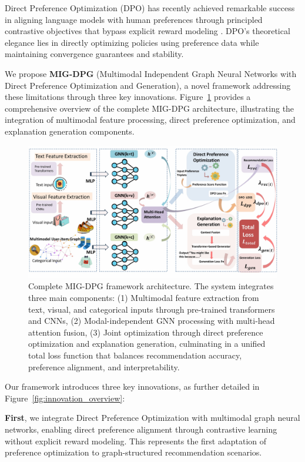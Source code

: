 \documentclass[pdflatex,sn-mathphys-num]{sn-jnl}%
\theoremstyle{thmstyleone}%
\theoremstyle{thmstyletwo}%
\theoremstyle{thmstylethree}%
\begin{document}
Direct Preference Optimization (DPO) has recently achieved remarkable success in aligning language models with human preferences through principled contrastive objectives that bypass explicit reward modeling \cite{rafailov2024direct}. DPO's theoretical elegance lies in directly optimizing policies using preference data while maintaining convergence guarantees and stability.

We propose \textbf{MIG-DPG} (Multimodal Independent Graph Neural Networks with Direct Preference Optimization and Generation), a novel framework addressing these limitations through three key innovations. Figure~\ref{fig:totalstructure} provides a comprehensive overview of the complete MIG-DPG architecture, illustrating the integration of multimodal feature processing, direct preference optimization, and explanation generation components.

\begin{figure}[H]
\centering
\includegraphics[width=\textwidth]{figures/totalstructure.png}
\caption{Complete MIG-DPG framework architecture. The system integrates three main components: (1) Multimodal feature extraction from text, visual, and categorical inputs through pre-trained transformers and CNNs, (2) Modal-independent GNN processing with multi-head attention fusion, (3) Joint optimization through direct preference optimization and explanation generation, culminating in a unified total loss function that balances recommendation accuracy, preference alignment, and interpretability.}
\label{fig:totalstructure}
\end{figure}

Our framework introduces three key innovations, as further detailed in Figure~\ref{fig:innovation_overview}:

\textbf{First}, we integrate Direct Preference Optimization with multimodal graph neural networks, enabling direct preference alignment through contrastive learning without explicit reward modeling. This represents the first adaptation of preference optimization to graph-structured recommendation scenarios.
\end{document}
